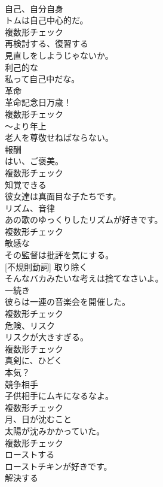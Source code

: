 \documentclass[8pt]{extreport}
\begin{document}
\begin{CJK}{UTF8}{min}
\\	[名詞]	自己、自分自身	
\\	トムは自己中心的だ。	
\\	複数形チェック
\\	[動詞]	再検討する、復習する	
\\	見直しをしようじゃないか。	
\\	[形容詞]	利己的な	
\\	私って自己中だな。	
\\	[名詞]	革命	
\\	革命記念日万歳！	
\\	複数形チェック
\\	[形容詞]	〜より年上	
\\	老人を尊敬せねばならない。	
\\	[名詞]	報酬	
\\	はい、ご褒美。	
\\	複数形チェック
\\	[形容詞]	知覚できる	
\\	彼女達は真面目な子たちです。	
\\	[名詞]	リズム、音律	
\\	あの歌のゆっくりしたリズムが好きです。	
\\	複数形チェック
\\	[形容詞]	敏感な	
\\	その監督は批評を気にする。	
\\	[動詞] [不規則動詞]	取り除く	
\\	そんなバカみたいな考えは捨てなさいよ。	
\\	[名詞]	一続き	
\\	彼らは一連の音楽会を開催した。	
\\	複数形チェック
\\	[名詞]	危険、リスク	
\\	リスクが大きすぎる。	
\\	複数形チェック
\\	[副詞]	真剣に、ひどく	
\\	本気？	
\\	[名詞]	競争相手	
\\	子供相手にムキになるなよ。	
\\	複数形チェック
\\	[名詞]	月、日が沈むこと	
\\	太陽が沈みかかっていた。	
\\	複数形チェック
\\	[動詞]	ローストする	
\\	ローストチキンが好きです。	
\\	[動詞]	解決する	

\end{CJK}
\end{document}
